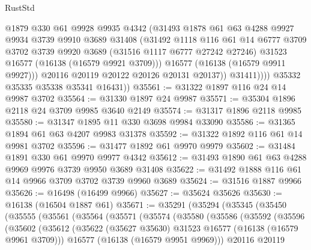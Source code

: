 \begin{lexlean}{RustStd}
\begin{coremodule}
                    @1879
                    @330
                    @61
                    @9928
                    @9935
                    @4342
                    (@31493
                      @1878
                      @61
                      @63
                      @4288
                      @9927
                      @9934
                      @3739
                      @9910
                      @3689
                      @31408
                      (@31492
                        @1118
                        @116
                        @61
                        @14
                        @6777
                        @3709
                        @3702
                        @3739
                        @9920
                        @3689
                        (@31516 @1117 @6777 @27242 @27246)
                        @31523
                        @16577
                        (@16138 (@16579 @9921 @3709)))
                      @16577
                      (@16138 (@16579 @9911 @9927)))
                    @20116
                    @20119
                    @20122
                    @20126
                    @20131
                    @20137))
                @31411))))
        @35332
        @35335
        @35338
        @35341
        @16431))
@35561 := @31322 @1897 @116 @24 @14 @9987 @3702
@35564 := @31330 @1897 @24 @9987
@35571 := @35304 @1896 @2118 @24 @3709 @9985 @3640 @2149
@35574 := @31317 @1896 @2118 @9985
@35580 := @31347 @1895 @11 @330 @3698 @9984 @33090
@35586 := @31365 @1894 @61 @63 @4207 @9983 @31378
@35592 := @31322 @1892 @116 @61 @14 @9981 @3702
@35596 := @31477 @1892 @61 @9970 @9979
@35602 := @31484 @1891 @330 @61 @9970 @9977 @4342
@35612 := @31493 @1890 @61 @63 @4288 @9969 @9976 @3739 @9950 @3689 @31408
@35622 := @31492 @1888 @116 @61 @14 @9966 @3709 @3702 @3739 @9960 @3689
@35624 := @31516 @1887 @9966
@35626 := @16498 (@16499 @9966)
@35627 := @35624 @35626
@35630 := @16138 (@16504 @1887 @61)
@35671 := @35291
    (@35294
      (@35345
        (@35450
          (@35555
            (@35561
              (@35564
                (@35571
                  (@35574
                    (@35580
                      (@35586
                        (@35592
                          (@35596
                            (@35602
                              (@35612
                                (@35622 (@35627 @35630) @31523 @16577 (@16138 (@16579 @9961 @3709)))
                                @16577
                                (@16138 (@16579 @9951 @9969)))
                              @20116
                              @20119

\end{coremodule}
\end{lexlean}
